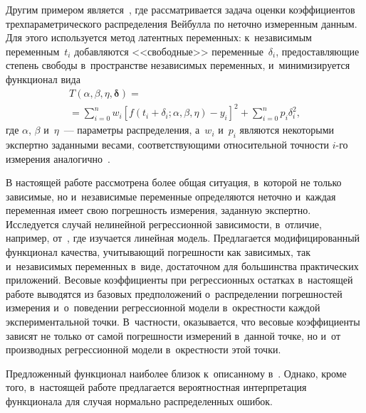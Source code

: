 \begin{multicols}{2}
Другим примером является~\cite{jukic2010nonlinear}, где рассматривается задача 
оценки коэффициентов трех\-па\-ра\-мет\-ри\-че\-ско\-го распределения Вейбулла по неточно 
измеренным данным.
Для этого используется метод латентных переменных: 
к~независимым переменным~$t_i$ добавляются <<свободные>> переменные~$\delta_i$,
предоставляющие степень свободы в~про\-стран\-ст\-ве независимых переменных, 
и~минимизируется функционал вида
\begin{multline*}
  T(\alpha, \beta, \eta, \boldsymbol{\delta}) ={}\\
  {}= \sum\limits_{i = 0}^n w_i \left[f(t_i + 
\delta_i; \alpha, \beta, \eta) - y_i\right]^2 +\sum\limits_{i = 0}^n p_i \delta_i^2,
\end{multline*}
где $\alpha$, $\beta$ и~$\eta$~--- параметры распределения, а~$w_i$ и~$p_i$ являются
некоторыми экспертно заданными весами, соответствующими относительной точ\-ности
\mbox{$i$-го} измерения аналогично~\cite{jukic2013nonlinear}.

В настоящей работе рассмотрена более общая ситуация, в~которой не только 
зависимые, но и~независимые переменные определяются неточно и~каж\-дая переменная
имеет свою погрешность измерения, заданную экспертно.
Исследуется случай нелинейной регрессионной зависимости, в~отличие, 
например,  от~\cite{kiryati2000heteroscedastic}, где изучается линейная модель.
Предлагается модифицированный функционал качества, учитывающий погрешности как
зависимых, так и~независимых переменных в~виде, достаточном для большинства
практических приложений. Весовые коэффициенты при регрессионных остатках
в~настоящей работе выводятся из базовых предположений о~рас\-пре\-де\-ле\-нии
погрешностей измерения и~о~поведении регрессионной модели в~окрест\-ности каж\-дой
экспериментальной точки. В~част\-ности, оказывается, что весовые коэффициенты
зависят не только от самой по\-греш\-ности измерений в~данной точке, но и~от
производных регрессионной модели в~окрестности этой точки.

Предложенный функционал наиболее близок к~описанному в~\cite{Boggs1987Stable}.
Однако, кроме того, в~настоящей работе предлагается вероятностная интерпретация
 функционала для случая нормально распределенных ошибок.


\end{multicols}
